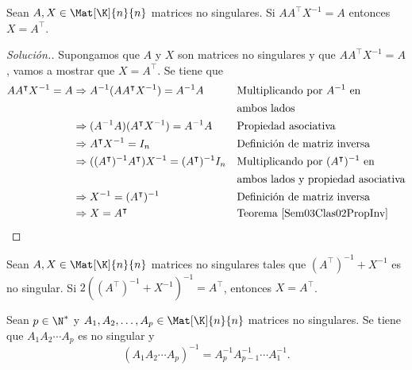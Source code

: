 \documentclass[compacto,10pt]{pubciencias-notas}
\begin{document}
\begin{ejem}\hspace{0pt} 
Sean $A, X\in\Mat[\K]{n}{n}$ matrices no singulares. Si $AA^{\intercal}X^{- 1} = A$ entonces $X = A^{\intercal}$.

\begin{proof}[Solución.]\hspace{0pt} Supongamos que $A$ y $X$ son matrices no singulares y que $AA^{\intercal}X^{- 1} = A$, vamos a mostrar que $X = A^{\intercal}$. Se tiene que
\begin{align*}
    AA^{\intercal}X^{- 1} = A
    &\Rightarrow A^{- 1}(AA^{\intercal}X^{- 1}) = A^{- 1}A
    && \text{Multiplicando por $A^{- 1}$ en}\\
    &\phantom{\Rightarrow A^{- 1}(AA^{\intercal}X^{- 1}) = A^{- 1}A}
    && \text{ambos lados}\\
    &\Rightarrow (A^{- 1}A)(A^{\intercal}X^{- 1}) = A^{- 1}A
    && \text{Propiedad asociativa}\\
    &\Rightarrow A^{\intercal}X^{- 1} = I_{n}
    && \text{Definición de matriz inversa}\\
    &\Rightarrow ((A^{\intercal})^{-1}A^{\intercal})X^{- 1} = (A^{\intercal})^{-1}I_{n}
    && \text{Multiplicando por $(A^{\intercal})^{-1}$ en}\\
    &\phantom{\Rightarrow ((A^{\intercal})^{-1}A^{\intercal})X^{- 1} = (A^{\intercal})^{-1}I_{n}}
    && \text{ambos lados y propiedad asociativa}\\
    &\Rightarrow X^{- 1} = (A^{\intercal})^{-1}
    && \text{Definición de matriz inversa}\\
    &\Rightarrow X = A^{\intercal}
    && \text{Teorema \ref{Sem03Clas02PropInv}}\qedhere
\end{align*}
\end{proof}
\end{ejem}

\begin{ejer}\hspace{0pt} 
Sean $A, X\in\Mat[\K]{n}{n}$ matrices no singulares tales que $(A^{\intercal})^{-1} + X^{- 1}$ es no singular. Si $2((A^{\intercal})^{-1} + X^{- 1})^{- 1} = A^{\intercal}$, entonces $X = A^{\intercal}$.
\end{ejer}

\begin{teo}
    Sean $p\in\N^*$ y $A_1, A_2, \ldots, A_p \in \Mat[\K]{n}{n}$ matrices no singulares. Se tiene que $A_1 A_2 \cdots A_p$ es no singular y 
    \[
        (A_1 A_2 \cdots A_p)^{-1} = A_p^{-1} A_{p-1}^{-1} \cdots A_1^{-1}.
    \]
\end{teo}
\end{document}
